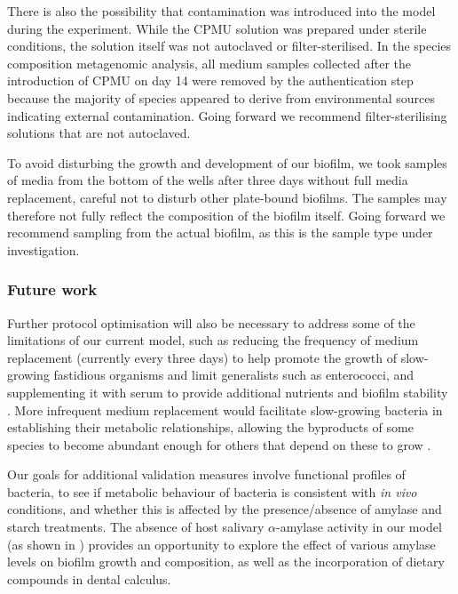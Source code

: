 \documentclass[10pt,a4paper]{article}
\begin{document}
There is also the possibility that contamination was introduced into the
model during the experiment. While the CPMU solution was prepared under
sterile conditions, the solution itself was not autoclaved or
filter-sterilised. In the species composition metagenomic analysis, all
medium samples collected after the introduction of CPMU on day 14 were
removed by the authentication step because the majority of species
appeared to derive from environmental sources indicating external
contamination. Going forward we recommend filter-sterilising solutions
that are not autoclaved.

To avoid disturbing the growth and development of our biofilm, we took
samples of media from the bottom of the wells after three days without
full media replacement, careful not to disturb other plate-bound
biofilms. The samples may therefore not fully reflect the composition of
the biofilm itself. Going forward we recommend sampling from the actual
biofilm, as this is the sample type under investigation.

\subsubsection*{Future work}\label{future-work}

Further protocol optimisation will also be necessary to address some of
the limitations of our current model, such as reducing the frequency of
medium replacement (currently every three days) to help promote the
growth of slow-growing fastidious organisms and limit generalists such
as enterococci, and supplementing it with serum to provide additional
nutrients and biofilm stability
\citep{tianUsingDGGE2010, ammannZurichBiofilm2012}. More infrequent
medium replacement would facilitate slow-growing bacteria in
establishing their metabolic relationships, allowing the byproducts of
some species to become abundant enough for others that depend on these
to grow \citep{marshDentalPlaque2005}.

Our goals for additional validation measures involve functional profiles
of bacteria, to see if metabolic behaviour of bacteria is consistent
with \emph{in vivo} conditions, and whether this is affected by the
presence/absence of amylase and starch treatments. The absence of host
salivary \(\alpha\)-amylase activity in our model (as shown in
\citep{bartholdyInvestigatingBiases2022}) provides an opportunity to
explore the effect of various amylase levels on biofilm growth and
composition, as well as the incorporation of dietary compounds in dental
calculus.
\end{document}
